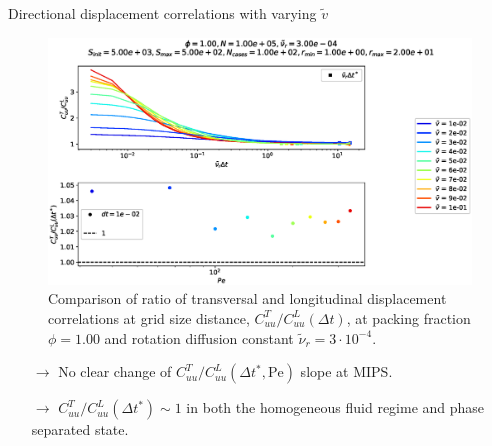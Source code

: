 \documentclass{beamer}
\begin{document}
\begin{frame}{Directional displacement correlations with varying $\tilde{v}$}

\vspace{-0.2cm}
\begin{figure}[h!]
  \centering
  \includegraphics[width=0.8\linewidth]{CuuLCuuT_Dl1000_Rh3000_Nq1000_Io5000_Mn1000_Cn5000.eps}
  \vspace{-0.2cm}
  \caption{Comparison of ratio of transversal and longitudinal displacement correlations at grid size distance, $C_{uu}^T/C_{uu}^L(\Delta t)$, at packing fraction $\phi=1.00$ and rotation diffusion constant $\tilde{\nu}_r=3\cdot10^{-4}$.}
\end{figure}

\vspace{-0.5cm}
\begin{itemize}
  \item[$\rightarrow$] No clear change of $C_{uu}^T/C_{uu}^L(\Delta t^*, \text{Pe})$ slope at MIPS.
  \item[$\rightarrow$] $C_{uu}^T/C_{uu}^L(\Delta t^*) \sim 1$ in both the homogeneous fluid regime and phase separated state.
\end{itemize}

\end{frame}
\end{document}
